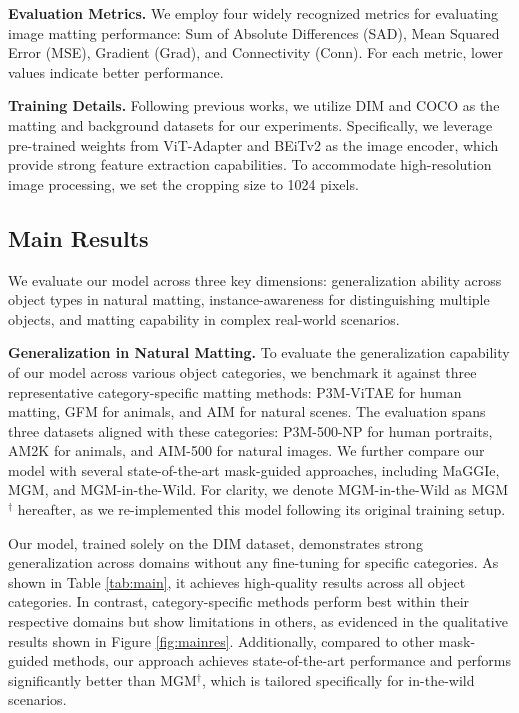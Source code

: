 \noindent
{\bf Evaluation Metrics.}
We employ four widely recognized metrics for evaluating image matting performance: Sum of Absolute Differences (SAD), Mean Squared Error (MSE), Gradient (Grad), and Connectivity (Conn). For each metric, lower values indicate better performance. 

\noindent
{\bf Training Details.}
Following previous works\cite{park2023mgmwild,yu2021mgm,xu2017dim,Lu2019indices}, we utilize DIM and COCO as the matting and background datasets for our experiments. Specifically, we leverage pre-trained weights from ViT-Adapter\cite{chen2022vitadapter} and BEiTv2\cite{peng2022beitv2} as the image encoder, which provide strong feature extraction capabilities. To accommodate high-resolution image processing, we set the cropping size to 1024 pixels.

\subsection{Main Results}
\label{sec:main}

We evaluate our model across three key dimensions: generalization ability across object types in natural matting, instance-awareness for distinguishing multiple objects, and matting capability in complex real-world scenarios.

\noindent
{\bf Generalization in Natural Matting.} To evaluate the generalization capability of our model across various object categories, we benchmark it against three representative category-specific matting methods: P3M-ViTAE\cite{rethink_p3m} for human matting, GFM\cite{li2022am2k} for animals, and AIM\cite{li2021aim500} for natural scenes. The evaluation spans three datasets aligned with these categories: P3M-500-NP for human portraits, AM2K for animals, and AIM-500 for natural images. We further compare our model with several state-of-the-art mask-guided approaches, including MaGGIe\cite{huynh2024maggie}, MGM\cite{yu2021mgm}, and MGM-in-the-Wild\cite{park2023mgmwild}. For clarity, we denote MGM-in-the-Wild as MGM$^\dagger$ hereafter, as we re-implemented this model following its original training setup.

Our model, trained solely on the DIM dataset, demonstrates strong generalization across domains without any fine-tuning for specific categories. As shown in Table \ref{tab:main}, it achieves high-quality results across all object categories. In contrast, category-specific methods perform best within their respective domains but show limitations in others, as evidenced in the qualitative results shown in Figure \ref{fig:mainres}. Additionally, compared to other mask-guided methods, our approach achieves state-of-the-art performance and performs significantly better than MGM$^\dagger$, which is tailored specifically for in-the-wild scenarios.

